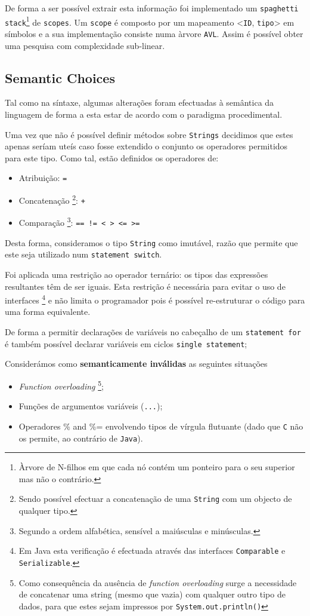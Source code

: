 \documentclass[a4paper]{article}
\begin{document}
\indent De forma a ser possível extrair esta informação foi implementado um \texttt{spaghetti stack}\footnote[1]{Àrvore de N-filhos em que cada nó contém um ponteiro para o seu superior mas não o contrário.} de \texttt{scopes}.
Um \texttt{scope} é composto por um mapeamento <\texttt{ID}, \texttt{tipo}> em símbolos e a sua implementação consiste numa àrvore \texttt{AVL}. Assim é 
possível obter uma pesquisa com complexidade sub-linear.

\cleardoublepage
\subsection{Semantic Choices}
\indent \indent Tal como na síntaxe, algumas alterações foram efectuadas 
à semântica da linguagem de forma a esta estar de acordo com o paradigma procedimental. 

\indent Uma vez que não é possível definir métodos sobre \texttt{Strings} decidimos que estes apenas seríam uteís
caso fosse extendido o conjunto os operadores permitidos para este tipo. Como tal, estão definidos os operadores de:
\begin{itemize}
	\item Atribuição: \quad \verb!=! 
  	\item Concatenação \footnote[2]{Sendo possível efectuar a concatenação de uma \texttt{String} com um objecto de qualquer tipo.}: \quad \verb!+! 
	\item Comparação \footnote[3]{Segundo a ordem alfabética, sensível a maiúsculas e minúsculas.}: \quad \verb|== != < > <= >=|
\end{itemize}

\indent Desta forma, consideramos o tipo \texttt{String} como imutável, razão que permite que este seja utilizado num
\texttt{statement switch}.

\indent Foi aplicada uma restrição ao operador ternário: os tipos das expressões resultantes têm de ser iguais.
Esta restrição é necessária para evitar o uso de interfaces \footnote[4]{Em Java esta verificação é efectuada através das interfaces \texttt{Comparable} e \texttt{Serializable}.}
e não limita o programador pois é possível re-estruturar o código para uma forma equivalente.

\indent De forma a permitir declarações de variáveis no cabeçalho de um \texttt{statement for} é também possível declarar variáveis em ciclos \texttt{single statement};

\indent Considerámos como \textbf{semanticamente inválidas} as seguintes situações
\begin{itemize}
	\item \textit{Function overloading} \footnote[5]{Como consequência da ausência de \textit{function overloading} surge a necessidade de concatenar
		uma string (mesmo que vazia) com qualquer outro tipo de dados, para que estes sejam impressos por \texttt{System.out.println()}};
	\item Funções de argumentos variáveis (\texttt{...});
	\item Operadores \% and \%= envolvendo tipos de vírgula flutuante (dado que \texttt{C} não os permite, ao contrário de \texttt{Java}).
\end{itemize}
\end{document}
